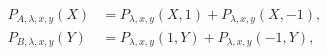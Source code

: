 \begin{align}
P_{A, \lambda,x,y}(X)&=P_{\lambda,x,y}(X, 1)+P_{\lambda,x,y}(X, -1),\label{PIone}\\
P_{B, \lambda,x,y}(Y)&=P_{\lambda,x,y}(1, Y)+P_{\lambda,x,y}(-1, Y),\label{PItwo}
\end{align}